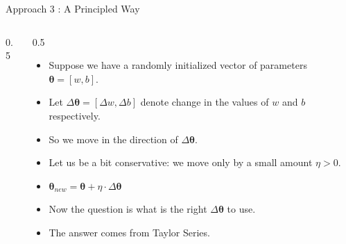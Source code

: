 \documentclass[10pt, aspectratio=169]{beamer}
\begin{document}
\begin{frame}{Approach 3 : A Principled Way}

\begin{columns}

\begin{column}{0.5\textwidth}
\end{column}

\begin{column}{0.5\textwidth}
\begin{itemize}
\item<1-> Suppose we have a randomly initialized vector of parameters $\symbf{\theta} = \left[ w, b \right]$.

\item<2-> Let $\Delta\symbf{\theta} = \left[ \Delta w, \Delta b \right]$ denote change in the values of $w$ and $b$ respectively. 

\item<3-> So we move in the direction of $\Delta\symbf{\theta}$.

\item<4-> Let us be a bit conservative: we move only by a small amount $\eta > 0$.

\item<5-> $\symbf{\theta}_{new} = \symbf{\theta} + \eta \cdot \Delta\symbf{\theta}$

\item<6-> Now the question is what is the right $\Delta\symbf{\theta}$ to use. 

\item<7-> The answer comes from Taylor Series.
\end{itemize}
\end{column}
\end{columns}

\end{frame}
\end{document}
